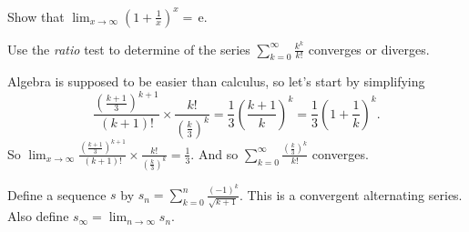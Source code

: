 \documentclass[12pt,fleqn]{exam}
\newcommand{\euler}{\, \mathrm{e}}
\begin{document}
\begin{questions} 

\question [1] Show that $\displaystyle \lim_{x\to \infty} \left(1+\frac{1}{x}\right)^x = \euler$.
\begin{solution}[2.8in]
\end{solution}

\question [1] Use the \emph{ratio} test to determine of the series $\displaystyle \sum_{k=0}^\infty \frac{ k^k }{ k!}$ converges or diverges.


\begin{solution}%
Algebra is supposed to be easier than calculus, so let's start by simplifying
\begin{equation*}
\frac{ (\frac{k+1}{3})^{k+1}}{(k+1)!} \times \frac{k!}{ (\frac{k}{3})^k} = 
\frac{1}{3} (\frac{k+1}{k})^k = \frac{1}{3}  (1 + \frac{1}{k})^k.
\end{equation*}
So $\displaystyle  \lim_{x \to \infty} \frac{ (\frac{k+1}{3})^{k+1}}{(k+1)!} \times \frac{k!}{ (\frac{k}{3})^k} = \frac{1}{3}$.
And so $\displaystyle \sum_{k=0}^\infty \frac{  \left(\frac{k}{3} \right)^k }{ k!}$ converges. 
\end{solution}

\newpage

\question [1] Define a sequence $s$ by $\displaystyle s_n = \sum_{k=0}^n \frac{(-1)^{k}}{\sqrt{k+1}}$.  This is a convergent alternating series.
Also define \mbox{$\displaystyle s_\infty = \lim_{n \to \infty}  s_n$.}



\end{questions}
\end{document}
